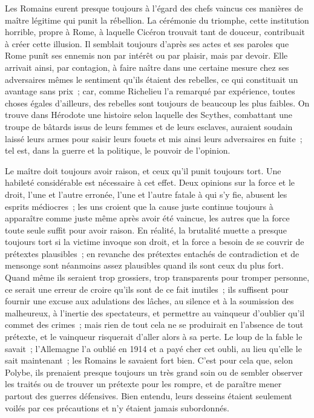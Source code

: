 \documentclass[french,twoside]{book} %
\begin{document}
\par
Les Romains eurent presque toujours à l'égard des chefs vaincus ces manières de maître légitime qui punit la rébellion. La cérémonie du triomphe, cette institution horrible, propre à Rome, à laquelle Cicéron trouvait tant de douceur, contribuait à créer cette illusion. Il semblait toujours d'après ses actes et ses paroles que Rome punît ses ennemis non par intérêt ou par plaisir, mais par devoir. Elle arrivait ainsi, par contagion, à faire naître dans une certaine mesure chez ses adversaires mêmes le sentiment qu'ils étaient des rebelles, ce qui constituait un avantage sans prix ; car, comme Richelieu l'a remarqué par expérience, toutes choses égales d'ailleurs, des rebelles sont toujours de beaucoup les plus faibles. On trouve dans Hérodote une histoire selon laquelle des Scythes, combattant une troupe de bâtards issus de leurs femmes et de leurs esclaves, auraient soudain laissé leurs armes pour saisir leurs fouets et mis ainsi leurs adversaires en fuite ; tel est, dans la guerre et la politique, le pouvoir de l'opinion.\par
Le maître doit toujours avoir raison, et ceux qu'il punit toujours tort. Une habileté considérable est nécessaire à cet effet. Deux opinions sur la force et le droit, l'une et l'autre erronée, l'une et l'autre fatale à qui s'y fie, abusent les esprits médiocres ; les uns croient que la cause juste continue toujours à apparaître comme juste même après avoir été vaincue, les autres que la force toute seule suffit pour avoir raison. En réalité, la brutalité muette a presque toujours tort si la victime invoque son droit, et la force a besoin de se couvrir de prétextes plausibles ; en revanche des prétextes entachés de contradiction et de mensonge sont néanmoins assez plausibles quand ils sont ceux du plus fort. Quand même ils seraient trop grossiers, trop transparents pour tromper per­sonne, ce serait une erreur de croire qu'ils sont de ce fait inutiles ; ils suffisent pour fournir une excuse aux adulations des lâches, au silence et à la soumis­sion des malheureux, à l'inertie des spectateurs, et permettre au vainqueur d'oublier qu'il commet des crimes ; mais rien de tout cela ne se produirait en l'absence de tout prétexte, et le vainqueur risquerait d'aller alors à sa perte. Le loup de la fable le savait ; l'Allemagne l'a oublié en 1914 et a payé cher cet oubli, au lieu qu'elle le sait maintenant ; les Romains le savaient fort bien. C'est pour cela que, selon Polybe, ils prenaient presque toujours un très grand soin ou de sembler observer les traités ou de trouver un prétexte pour les rompre, et de paraître mener partout des guerres défensives. Bien entendu, leurs desseins étaient seulement voilés par ces précautions et n'y étaient jamais subordonnés.\par
\end{document}

